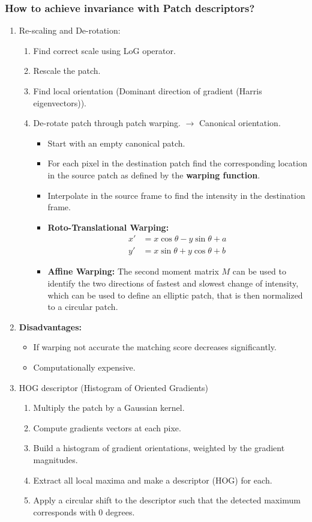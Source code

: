 \documentclass[10pt,a4paper]{scrartcl}
\begin{document}
\begin{multicols*}{2}
\subsubsection{How to achieve invariance with Patch descriptors?}

\begin{enumerate}
\item Re-scaling and De-rotation:
\begin{enumerate}
\item Find correct scale using LoG operator.
\item Rescale the patch.
\item Find local orientation (Dominant direction of gradient (Harris eigenvectors)).
\item De-rotate patch through patch warping. $\rightarrow$ Canonical orientation.
\begin{itemize}
\item Start with an empty canonical patch.
\item For each pixel in the destination patch find the corresponding location in the source patch as defined by the \textbf{warping function}.
\item Interpolate in the source frame to find the intensity in the destination frame.
\item \textbf{Roto-Translational Warping:} \begin{align*}
x'&=x\cos\theta-y\sin\theta+a\\y'&=x\sin\theta+y\cos\theta+b
\end{align*}
\item \textbf{Affine Warping:} The second moment matrix $M$ can be used to identify the two directions of fastest and slowest change of intensity, which can be used to define an elliptic patch, that is then normalized to a circular patch.
\end{itemize}
\end{enumerate}
\item \textbf{Disadvantages:}
\begin{itemize}
\item If warping not accurate the matching score decreases significantly.
\item Computationally expensive.
\end{itemize}
\item HOG descriptor (Histogram of Oriented Gradients)
\begin{enumerate}
\item Multiply the patch by a Gaussian kernel.
\item Compute gradients vectors at each pixe.
\item Build a histogram of gradient orientations, weighted by the gradient magnitudes.
\item Extract all local maxima and make a descriptor (HOG) for each.
\item Apply a circular shift to the descriptor such that the detected maximum corresponds with $0$ degrees.


\end{enumerate}
\end{enumerate}
\end{multicols*}
\end{document}
